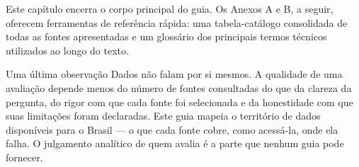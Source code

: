 Este capítulo encerra o corpo principal do guia. Os Anexos A e B, a seguir, oferecem ferramentas de referência rápida: uma tabela-catálogo consolidada de todas as fontes apresentadas e um glossário dos principais termos técnicos utilizados ao longo do texto.

\medskip

\begin{boxdestaque}{Uma última observação}
Dados não falam por si mesmos. A qualidade de uma avaliação depende menos do número de fontes consultadas do que da clareza da pergunta, do rigor com que cada fonte foi selecionada e da honestidade com que suas limitações foram declaradas. Este guia mapeia o território de dados disponíveis para o Brasil --- o que cada fonte cobre, como acessá-la, onde ela falha. O julgamento analítico de quem avalia é a parte que nenhum guia pode fornecer.
\end{boxdestaque}
